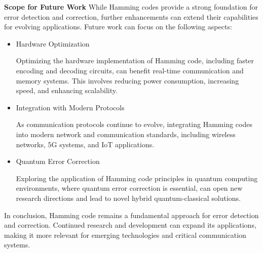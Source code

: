 \documentclass{article}
\numberwithin{equation}{section}
\numberwithin{figure}{section}
\numberwithin{table}{section}
\begin{document}

 




\textbf{Scope for Future Work}
While Hamming codes provide a strong foundation for error detection and correction, further enhancements can extend their capabilities for evolving applications. Future work can focus on the following aspects:
\begin{itemize}

\item {Hardware Optimization}

Optimizing the hardware implementation of Hamming code, including faster encoding and decoding circuits, can benefit real-time communication and memory systems. This involves reducing power consumption, increasing speed, and enhancing scalability.

\item {Integration with Modern Protocols}

As communication protocols continue to evolve, integrating Hamming codes into modern network and communication standards, including wireless networks, 5G systems, and IoT applications.

\item {Quantum Error Correction}

Exploring the application of Hamming code principles in quantum computing environments, where quantum error correction is essential, can open new research directions and lead to novel hybrid quantum-classical solutions.
\end{itemize}
In conclusion, Hamming code remains a fundamental approach for error detection and correction. Continued research and development can expand its applications, making it more relevant for emerging technologies and critical communication systems.

\pagebreak





 
  



    



\end{document}
